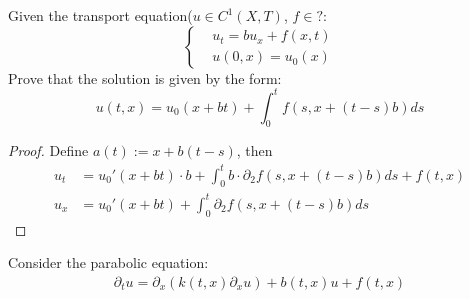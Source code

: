 \begin{exercise}
Given the transport equation($u \in C^1(X, T)$, $f \in ?$:
\begin{equation*}
\left\{
\begin{aligned}
	&u_t = bu_x + f(x, t)\\
	&u(0, x) = u_0(x)
\end{aligned}
\right.
\end{equation*}
Prove that the solution is given by the form:
\begin{equation*}
	u(t, x) = u_0(x + bt) + \int_0^t f(s, x + (t - s)b) ds
\end{equation*}
\begin{proof}
	Define $a(t) := x + b(t - s)$, then
\begin{align*}
		u_t &= u_0'(x + bt) \cdot b + \int_0^t b \cdot  \partial_2 f(s, x + (t - s)b)  ds + f(t, x) \\
		u_x &= u_0'(x + bt) + \int _0^t  \partial_2 f(s, x + (t -s)b) ds
	\end{align*}
\end{proof}
\end{exercise}

\begin{exercise}
\end{exercise}

\begin{exercise}
	Consider the parabolic equation:
	\begin{align*}
		\partial_t u = \partial_x (k(t, x) \partial_x u) + b(t, x) u + f(t, x)
	\end{align*}
\end{exercise}


